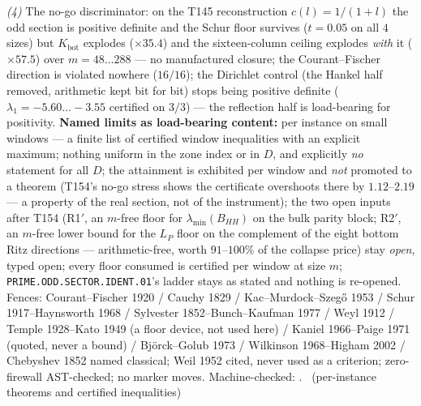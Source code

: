 \emph{(4)} The no-go discriminator: on the T145 reconstruction
$c(l)=1/(1+l)$ the odd section is positive definite and the Schur floor
survives ($t=0.05$ on all $4$ sizes) but $K_{\mathrm{bot}}$ explodes
($\times35.4$) and the sixteen-column ceiling explodes \emph{with} it
($\times57.5$) over $m=48\ldots288$ --- no manufactured closure; the
Courant--Fischer direction is violated nowhere ($16/16$); the Dirichlet
control (the Hankel half removed, arithmetic kept bit for bit) stops
being positive definite ($\lambda_1=-5.60\ldots-3.55$ certified on
$3/3$) --- the reflection half is load-bearing for positivity.
\textbf{Named limits as load-bearing content:} per instance on small
windows --- a finite list of certified window inequalities with an
explicit maximum; nothing uniform in the zone index or in $D$, and
explicitly \emph{no} statement for all $D$; the attainment is exhibited
per window and \emph{not} promoted to a theorem (T154's no-go stress
shows the certificate overshoots there by $1.12$--$2.19$ --- a property
of the real section, not of the instrument); the two open inputs after
T154 (R1$'$, an $m$-free floor for $\lambda_{\min}(B_{HH})$ on the bulk
parity block; R2$'$, an $m$-free lower bound for the $L_P$ floor on the
complement of the eight bottom Ritz directions --- arithmetic-free,
worth $91$--$100\%$ of the collapse price) stay \emph{open}, typed open;
every floor consumed is certified per window at size $m$;
\texttt{PRIME.ODD.SECTOR.IDENT.01}'s ladder stays as stated and nothing
is re-opened. Fences: Courant--Fischer 1920 / Cauchy 1829 /
Kac--Murdock--Szeg\H{o} 1953 / Schur 1917--Haynsworth 1968 / Sylvester
1852--Bunch--Kaufman 1977 / Weyl 1912 / Temple 1928--Kato 1949 (a floor
device, not used here) / Kaniel 1966--Paige 1971 (quoted, never a bound)
/ Bj\"orck--Golub 1973 / Wilkinson 1968--Higham 2002 / Chebyshev 1852
named classical; Weil 1952 cited, never used as a criterion;
zero-firewall AST-checked; no marker moves.
Machine-checked: .
\mE\ (per-instance theorems and certified inequalities)


